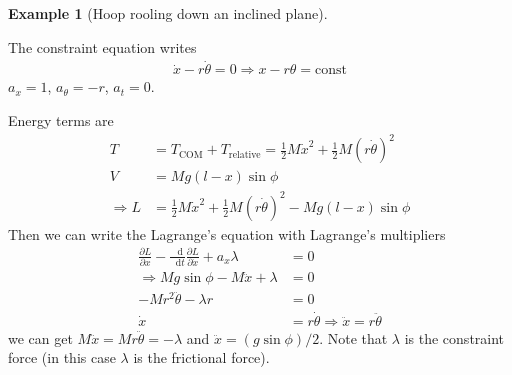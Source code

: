 \documentclass[twoside,9pt]{article}
\numberwithin{equation}{section} %
\newcommand{\lms}{\fontfamily{lmss}\selectfont} %
\renewcommand*\d{\mathop{}\!\mathrm{d}}
\theoremstyle{definition}
\newtheorem{example}{\lms Example}[section]
\theoremstyle{remark}
\begin{document}
\begin{example}[Hoop rooling down an inclined plane]\
\tikzexternalenable
\begin{figure}[H]
    \centering
\end{figure}
\tikzexternaldisable
The constraint equation writes
\begin{align*}
    \dot{x} - r\dot{\theta} = 0
    \Rightarrow x - r\theta = \text{const}
\end{align*}
$a_x=1$, $a_\theta = -r$, $a_t=0$.

Energy terms are
\begin{align*}
    T &= 
    T_\text{COM} + T_\text{relative}
    = \frac{1}{2}M\dot{x}^2 + \frac{1}{2}M(r\dot{\theta})^2\\
    V &= Mg(l-x)\sin\phi\\
    \Rightarrow
    L &=  \frac{1}{2}M\dot{x}^2 + \frac{1}{2}M(r\dot{\theta})^2
    - Mg(l-x)\sin\phi
\end{align*}
Then we can write the Lagrange's equation with Lagrange's multipliers
\begin{align*}
    \frac{\partial L}{\partial x} - \frac{\d }{\d t}\frac{\partial L}{\partial \dot{x}}
    + a_x\lambda &= 0\\
    \Rightarrow
    Mg\sin\phi - M\ddot{x} + \lambda &= 0\\
    -Mr^2\ddot{\theta} - \lambda r &= 0\\
    \dot{x} &= r\dot{\theta}\Rightarrow
    \ddot{x} = r\ddot{\theta}
\end{align*}
we can get $M\ddot{x} = Mr\ddot{\theta} = -\lambda$ and 
$\ddot{x} = (g\sin\phi)/2$.
Note that $\lambda$ is the constraint force (in this case $\lambda$
is the frictional force).
\end{example}
\end{document}
